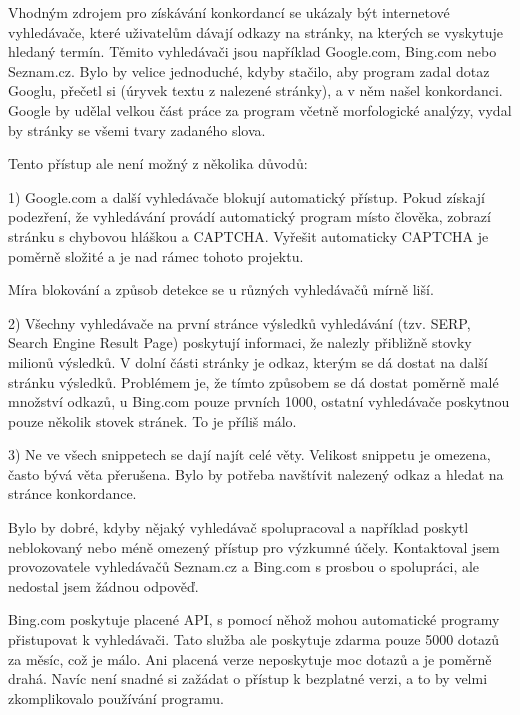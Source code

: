 \medskip
{}


Vhodným zdrojem pro získávání konkordancí se ukázaly být internetové
vyhledávače, které uživatelům dávají odkazy na stránky, na kterých se
vyskytuje hledaný termín. Těmito vyhledávači jsou například Google.com,
Bing.com nebo Seznam.cz. Bylo by velice jednoduché, kdyby stačilo, aby
program zadal dotaz Googlu, přečetl si  (úryvek textu z nalezené
stránky), a v něm našel konkordanci. Google by udělal velkou část práce za
program včetně morfologické analýzy, vydal by stránky se všemi tvary
zadaného slova.

Tento přístup ale není možný z několika důvodů:

\bigskip

1) Google.com a další vyhledávače blokují automatický přístup. Pokud
získají podezření, že vyhledávání provádí automatický program místo
člověka, zobrazí stránku s chybovou hláškou a CAPTCHA. Vyřešit automaticky
CAPTCHA je poměrně složité a je nad rámec tohoto projektu.

Míra blokování a způsob detekce se u různých vyhledávačů mírně liší.

2) Všechny vyhledávače na první stránce výsledků vyhledávání (tzv. SERP,
Search Engine Result Page) poskytují informaci, že nalezly přibližně stovky
milionů výsledků. V dolní části stránky je odkaz, kterým se dá dostat na
další stránku výsledků. Problémem je, že tímto způsobem se dá dostat
poměrně malé množství odkazů, u Bing.com pouze prvních 1000, ostatní
vyhledávače poskytnou pouze několik stovek stránek. To je příliš málo.

3) Ne ve všech snippetech se dají najít celé věty. Velikost snippetu je
omezena, často bývá věta přerušena. Bylo by potřeba navštívit nalezený
odkaz a hledat na stránce konkordance.

\bigskip

Bylo by dobré, kdyby nějaký vyhledávač spolupracoval a například poskytl
neblokovaný nebo méně omezený přístup pro výzkumné účely. Kontaktoval jsem
provozovatele vyhledávačů Seznam.cz a Bing.com s prosbou o spolupráci, ale nedostal
jsem žádnou odpověď. 

Bing.com poskytuje placené API, s pomocí něhož mohou automatické programy
přistupovat k vyhledávači. Tato služba ale poskytuje zdarma pouze 5000 dotazů za
měsíc, což je málo. Ani placená verze neposkytuje moc dotazů a je
poměrně drahá. Navíc není snadné si zažádat o přístup k bezplatné verzi,
a to by velmi zkomplikovalo používání programu.

